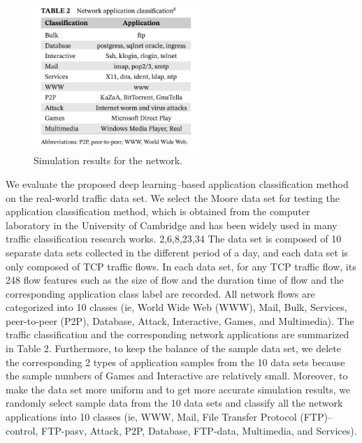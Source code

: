 \documentclass[10pt,journal,compsoc]{IEEEtran}
\begin{document}
\begin{figure}[!t]
\centering
\includegraphics[width=2.5in]{dataset_distribution}
\caption{Simulation results for the network.}
\label{fig_sim}
\end{figure}


\cite{}
We evaluate the proposed deep learning–based application classification method on the real-world traffic data set. We
select the Moore data set for testing the application classification method, which is obtained from the computer laboratory
in the University of Cambridge and has been widely used in many traffic classification research works.
2,6,8,23,34
The data
set is composed of 10 separate data sets collected in the different period of a day, and each data set is only composed
of TCP traffic flows. In each data set, for any TCP traffic flow, its 248 flow features such as the size of flow and the
duration time of flow and the corresponding application class label are recorded. All network flows are categorized into
10 classes (ie, World Wide Web (WWW), Mail, Bulk, Services, peer-to-peer (P2P), Database, Attack, Interactive, Games,
and Multimedia). The traffic classification and the corresponding network applications are summarized in Table 2.
Furthermore, to keep the balance of the sample data set, we delete the corresponding 2 types of application samples
from the 10 data sets because the sample numbers of Games and Interactive are relatively small. Moreover, to make the
data set more uniform and to get more accurate simulation results, we randomly select sample data from the 10 data sets
and classify all the network applications into 10 classes (ie, WWW, Mail, File Transfer Protocol (FTP)–control, FTP-pasv,
Attack, P2P, Database, FTP-data, Multimedia, and Services).
\end{document}
